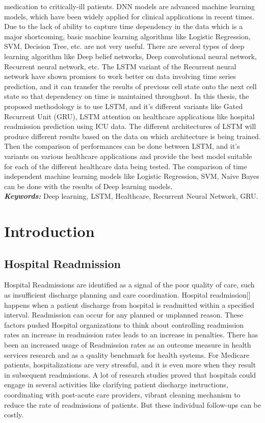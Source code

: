 \documentclass[12pt,a4paper]{article}
\begin{document}
medication to critically-ill patients. DNN models are advanced machine learning models,
which have been widely applied for clinical applications in recent times. Due to the lack of ability to capture time dependency in the data which is a major shortcoming, basic machine learning algorithms like Logistic Regression, SVM, Decision Tree, etc. are not very useful. There are several types of deep
learning algorithm like Deep belief networks, Deep convolutional neural network, Recurrent neural
network, etc. The LSTM variant of the Recurrent neural network have shown promises to work better
on data involving time series prediction, and it can transfer the results of previous
cell state onto the next cell state so that dependency on time is maintained throughout. In
this thesis, the proposed methodology is to use LSTM, and it’s different variants like Gated Recurrent Unit (GRU),
LSTM attention on healthcare applications like hospital readmission prediction using ICU data. The different
architectures of LSTM will produce different results based on the data on which architecture is being
trained. Then the comparison of performances can be done between LSTM, and it's variants on various healthcare
applications and provide the best model suitable for each of the different healthcare data being
tested. The comparison of time independent machine learning models like Logistic Regression,
SVM, Naive Bayes can be done with the results of Deep learning models.\\

\textbf{\textit{Keywords:}} Deep learning, LSTM, Healthcare, Recurrent Neural Network, GRU.
\clearpage
\tableofcontents
\newpage
\clearpage
\section{Introduction}

\subsection{Hospital Readmission}
Hospital Readmissions are identified as a signal of the poor quality of care, such as insufficient discharge planning and care coordination. Hospital readmission[] happens when a patient discharge from hospital is readmitted within a specified interval. Readmission can occur for any planned
or unplanned reason. These factors pushed Hospital organizations to think about controlling readmission rates an increase in readmission rates leads to an increase in penalties. There has been an increased usage of Readmission rates as an outcome measure in health services research and as a quality benchmark for health systems. For Medicare patients, hospitalizations are very stressful, and it is even more when they result in subsequent readmissions. A lot of research studies proved that hospitals could engage in several activities like clarifying patient discharge instructions, coordinating with post-acute care providers, vibrant cleaning mechanism to reduce the rate of readmissions of patients. But these individual follow-ups can be costly.
\end{document}

